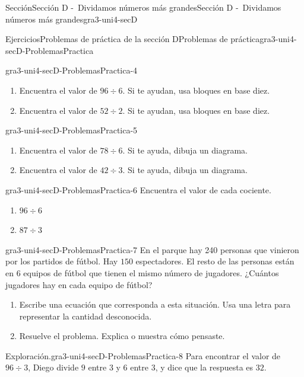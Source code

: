 \documentclass[twoside,10pt,]{article}
\begin{document}
\begin{sectionptx}{Sección}{Sección D -~Dividamos números más grandes}{}{Sección D -~Dividamos números más grandes}{}{}{gra3-uni4-secD}
\begin{exercises-subsection}{Ejercicios}{Problemas de práctica de la sección D}{}{Problemas de práctica}{}{}{gra3-uni4-secD-ProblemasPractica}
\begin{divisionexercise}{2}{}{}{gra3-uni4-secD-ProblemasPractica-4}
\begin{enumerate}[label=(\alph*)]
\item{}Encuentra el valor de \(96 \div 6\). Si te ayudan, usa bloques en base diez.%
\item{}Encuentra el valor de \(52 \div 2\). Si te ayudan, usa bloques en base diez.%
\end{enumerate}
\end{divisionexercise}%
\begin{divisionexercise}{3}{}{}{gra3-uni4-secD-ProblemasPractica-5}%
%
\begin{enumerate}[label=(\alph*)]
\item{}Encuentra el valor de \(78 \div 6\). Si te ayuda, dibuja un diagrama.%
\item{}Encuentra el valor de \(42 \div 3\). Si te ayuda, dibuja un diagrama.%
\end{enumerate}
\end{divisionexercise}%
\begin{divisionexercise}{4}{}{}{gra3-uni4-secD-ProblemasPractica-6}%
Encuentra el valor de cada cociente.%
%
\begin{enumerate}[label=(\alph*)]
\item{}\(\displaystyle 96 \div 6\)%
\item{}\(\displaystyle 87 \div 3\)%
\end{enumerate}
\end{divisionexercise}%
\begin{divisionexercise}{5}{}{}{gra3-uni4-secD-ProblemasPractica-7}%
En el parque hay 240 personas que vinieron por los partidos de fútbol. Hay \(150\) espectadores. El resto de las personas están en \(6\) equipos de fútbol que tienen el mismo número de jugadores. ¿Cuántos jugadores hay en cada equipo de fútbol?%
%
\begin{enumerate}[label=(\alph*)]
\item{}Escribe una ecuación que corresponda a esta situación. Usa una letra para representar la cantidad desconocida.%
\item{}Resuelve el problema. Explica o muestra cómo pensaste.%
\end{enumerate}
\end{divisionexercise}%
\begin{divisionexercise}{6}{Exploración.}{}{gra3-uni4-secD-ProblemasPractica-8}%
Para encontrar el valor de \(96 \div 3\), Diego divide \(9\) entre \(3\) y \(6\) entre \(3\), y dice que la respuesta es \(32\).%
%
\begin{enumerate}[label=(\alph*)]

\end{enumerate}
\end{divisionexercise}
\end{exercises-subsection}
\end{sectionptx}
\end{document}
